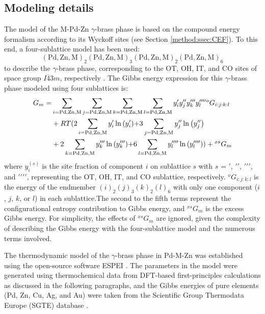 \subsection{Modeling details} \label{intermetallics:ssec:PdZnMmodel}
The model of the M-Pd-Zn $\gamma$-brass phase is based on the compound energy formalism according to its Wyckoff sites (see Section \ref{method:ssec:CEF}). To this end, a four-sublattice model has been used:
\begin{equation} \label{intermetallics:eq:PdZnMmodel}
    \mathrm{(Pd,Zn,M)_2(Pd,Zn,M)_3(Pd,Zn,M)_2(Pd,Zn,M)_6}
\end{equation}
to describe the $\gamma$-brass phase, corresponding to the OT, OH, IT, and CO sites of space group $I\overline{4}3m$, respectively \cite{strom1969x}. The Gibbs energy expression for this $\gamma$-brass phase modeled using four sublattices is:
\begin{equation}
    \begin{aligned}
        G_m=&\sum_{i={\rm Pd,Zn,M}}\sum_{j={\rm Pd,Zn,M}}\sum_{k={\rm Pd,Zn,M}}\sum_{l={\rm Pd,Zn,M}}{y_i^\prime y_j^{\prime\prime}y_k^{\prime\prime\prime}y_l^{\prime\prime\prime\prime}{{^o}G}_{i:j:k:l}}\\&+RT(2\sum_{i={\rm Pd,Zn,M}}{y_i^\prime\ln{\left(y_i^\prime\right)}+}3\sum_{j={\rm Pd,Zn,M}}{y_j^{\prime\prime}\ln{\left(y_j^{\prime\prime}\right)}}\\&+2\sum_{k={\rm Pd,Zn,M}}{y_k^{\prime\prime\prime}\ln{\left(y_k^{\prime\prime\prime}\right)}+}6\sum_{l={\rm Pd,Zn,M}}{y_l^{\prime\prime\prime\prime}\ln{\left(y_l^{\prime\prime\prime\prime}\right)}})+{^{xs}}G_m
    \end{aligned}
\end{equation}
where $y_i^{\left(s\right)}$ is the site fraction of component $i$ on sublattice $s$ with $s$ = $\prime$, $\prime\prime$, $\prime\prime\prime$, and $\prime\prime\prime\prime$, representing the OT, OH, IT, and CO sublattice, respectively. ${^o}G_{i:j:k:l}$ is the energy of the endmember $\left(i\right)_2\left(j\right)_3\left(k\right)_2\left(l\right)_6$ with only one component ($i$, $j$, $k$, or $l$) in each sublattice.The second to the fifth terms represent the configurational entropy contribution to Gibbs energy, and $^{xs}G_m$ is the excess Gibbs energy. For simplicity, the effects of $^{xs}G_m$ are ignored, given the complexity of describing the Gibbs energy with the four-sublattice model and the numerous terms involved.

The thermodynamic model of the $\gamma$-brass phase in Pd-M-Zn was established using the open-source software ESPEI \cite{bocklund2019espei}. The parameters in the model were generated using thermochemical data from DFT-based first-principles calculations as discussed in the following paragraphs, and the Gibbs energies of pure elements (Pd, Zn, Cu, Ag, and Au) were taken from the Scientific Group Thermodata Europe (SGTE) database \cite{sgteurl}.

